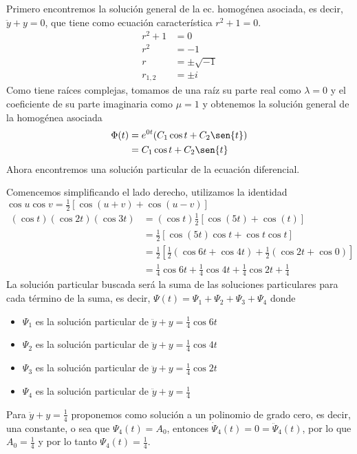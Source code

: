 \documentclass{article}
\begin{document}
\begin{enumerate}
{            \color{azul}
            Primero encontremos la solución general de la ec. homogénea asociada, es decir,
            $\ddot y+y=0$, que tiene como ecuación característica $r^2+1=0$.
            \begin{align*}
                r^2+1 &= 0 \\
                r^2 &= -1 \\
                r &= \pm\sqrt{-1} \\
                r_{1,2} &= \pm i
            \end{align*}
            Como tiene raíces complejas, tomamos de una raíz su parte real como $\lambda=0$ y el
            coeficiente de su parte imaginaria como $\mu=1$ y obtenemos la solución general de 
            la homogénea asociada
            \begin{align*}
                \Phi(t) &= e^{0t}(C_1\cos{t}+C_2\sen{t}) \\
                        &= C_1\cos{t}+C_2\sen{t}
            \end{align*}
            Ahora encontremos una solución particular de la ecuación diferencial.

            Comencemos simplificando el lado derecho, utilizamos la identidad
            $\cos{u}\cos{v}=\frac{1}{2}\left[\cos{(u+v)}+\cos{(u-v)}\right]$
            \begin{align*}
                (\cos{t})(\cos{2t})(\cos{3t})
                &= (\cos{t})\frac{1}{2}\left[
                    \cos{(5t)}+\cos{(t)}
                \right]\\
                &= \frac{1}{2}\left[
                    \cos{(5t)}\cos{t}+\cos{t}\cos{t}
                \right] \\
                &= \frac{1}{2}\left[
                    \frac{1}{2}(\cos{6t}+\cos{4t})
                    +\frac{1}{2}(\cos{2t}+\cos{0})
                \right] \\
                &= \frac{1}{4}\cos{6t} + \frac{1}{4}\cos{4t} + \frac{1}{4}\cos{2t} + \frac{1}{4}
            \end{align*}
            La solución particular buscada será la suma de las soluciones particulares para cada
            término de la suma, es decir, $\Psi(t)=\Psi_1+\Psi_2+\Psi_3+\Psi_4$ donde
            \begin{itemize}
                \item $\Psi_1$ es la solución particular de $\ddot y+y=\frac{1}{4}\cos{6t}$
                \item $\Psi_2$ es la solución particular de $\ddot y+y=\frac{1}{4}\cos{4t}$
                \item $\Psi_3$ es la solución particular de $\ddot y+y=\frac{1}{4}\cos{2t}$
                \item $\Psi_4$ es la solución particular de $\ddot y+y=\frac{1}{4}$
            \end{itemize}
            Para $\ddot y+y=\frac{1}{4}$ proponemos como solución a un polinomio de grado cero, es
            decir, una constante, o sea que $\Psi_4(t)=A_0$, entonces
            $\dot\Psi_4(t)=0=\ddot\Psi_4(t)$, por lo que $A_0=\frac{1}{4}$ y por lo tanto
            $\Psi_4(t)=\frac{1}{4}$.

}
\end{enumerate}
\end{document}
